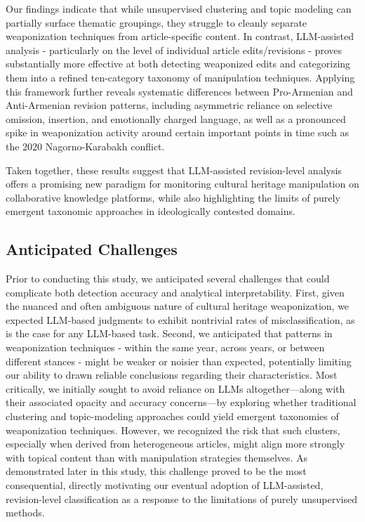 \documentclass[11pt, a4paper, twoside, openright]{article} %
\begin{document}
Our findings indicate that while unsupervised clustering and topic modeling can partially surface thematic groupings, they struggle to cleanly separate weaponization techniques from article-specific content. In contrast, LLM-assisted analysis - particularly on the level of individual article edits/revisions - proves substantially more effective at both detecting weaponized edits and categorizing them into a refined ten-category taxonomy of manipulation techniques. Applying this framework further reveals systematic differences between Pro-Armenian and Anti-Armenian revision patterns, including asymmetric reliance on selective omission, insertion, and emotionally charged language, as well as a pronounced spike in weaponization activity around certain important points in time such as the 2020 Nagorno-Karabakh conflict.

Taken together, these results suggest that LLM-assisted revision-level analysis offers a promising new paradigm for monitoring cultural heritage manipulation on collaborative knowledge platforms, while also highlighting the limits of purely emergent taxonomic approaches in ideologically contested domains.

\subsection{Anticipated Challenges}

Prior to conducting this study, we anticipated several challenges that could complicate both detection accuracy and analytical interpretability. First, given the nuanced and often ambiguous nature of cultural heritage weaponization, we expected LLM-based judgments to exhibit nontrivial rates of misclassification, as is the case for any LLM-based task. Second, we anticipated that patterns in weaponization techniques - within the same year, across years, or between different stances - might be weaker or noisier than expected, potentially limiting our ability to drawn reliable conclusions regarding their characteristics. Most critically, we initially sought to avoid reliance on LLMs altogether—along with their associated opacity and accuracy concerns—by exploring whether traditional clustering and topic-modeling approaches could yield emergent taxonomies of weaponization techniques. However, we recognized the risk that such clusters, especially when derived from heterogeneous articles, might align more strongly with topical content than with manipulation strategies themselves. As demonstrated later in this study, this challenge proved to be the most consequential, directly motivating our eventual adoption of LLM-assisted, revision-level classification as a response to the limitations of purely unsupervised methods.
\end{document}
